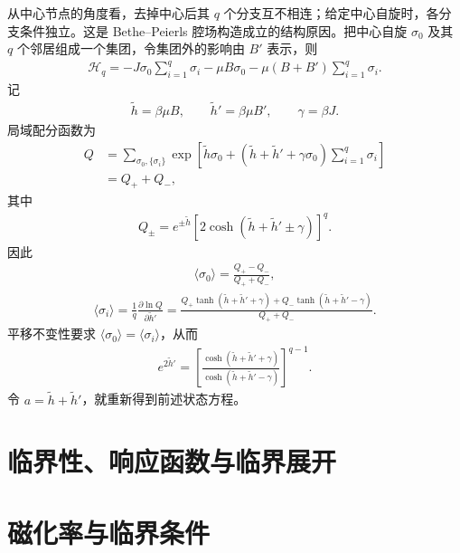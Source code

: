 从中心节点的角度看，去掉中心后其 \(q\) 个分支互不相连；给定中心自旋时，各分支条件独立。这是 Bethe--Peierls 腔场构造成立的结构原因。把中心自旋 \(\sigma_0\) 及其 \(q\) 个邻居组成一个集团，令集团外的影响由 \(B'\) 表示，则
\begin{align*}
	\mathcal H_q
	=-J\sigma_0\sum_{i=1}^q\sigma_i
	-\mu B\sigma_0
	-\mu(B+B')\sum_{i=1}^q\sigma_i .
\end{align*}
记
\begin{align*}
	\widetilde h=\beta\mu B,\qquad
	\widetilde h'=\beta\mu B',\qquad
	\gamma=\beta J .
\end{align*}
局域配分函数为
\begin{align*}
	Q&=\sum_{\sigma_0,\{\sigma_i\}}
	\exp\left[
	\widetilde h\sigma_0+
	\left(\widetilde h+\widetilde h'
	+\gamma\sigma_0\right)\sum_{i=1}^q\sigma_i
	\right]\\
	&=Q_++Q_-,
\end{align*}
其中
\begin{align*}
	Q_\pm=e^{\pm\widetilde h}
	\left[2\cosh\left(\widetilde h+\widetilde h'\pm\gamma\right)\right]^q.
\end{align*}
因此
\begin{align*}
	\langle\sigma_0\rangle
	=\frac{Q_+-Q_-}{Q_++Q_-},
\end{align*}
\begin{align*}
	\langle\sigma_i\rangle
	=\frac1q\frac{\partial\ln Q}{\partial\widetilde h'}
	=\frac{
	Q_+\tanh(\widetilde h+\widetilde h'+\gamma)
	+Q_-\tanh(\widetilde h+\widetilde h'-\gamma)}
	{Q_++Q_-}.
\end{align*}
平移不变性要求 \(\langle\sigma_0\rangle=\langle\sigma_i\rangle\)，从而
\begin{align*}
	e^{2\widetilde h'}
	=\left[
	\frac{\cosh(\widetilde h+\widetilde h'+\gamma)}
	{\cosh(\widetilde h+\widetilde h'-\gamma)}
	\right]^{q-1}.
\end{align*}
令 \(a=\widetilde h+\widetilde h'\)，就重新得到前述状态方程。

\section{临界性、响应函数与临界展开}

\section{磁化率与临界条件}

